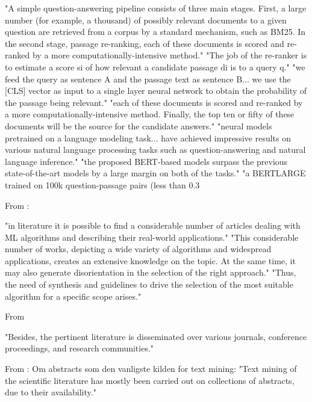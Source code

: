"A simple question-answering pipeline consists of three main stages. First, a large number (for example, a thousand) of possibly relevant documents to a given question are retrieved from a corpus by a standard mechanism, such as BM25. In the second stage, passage re-ranking, each of these documents is scored and re-ranked by a more computationally-intensive method."
"The job of the re-ranker is to estimate a score si of how relevant a candidate passage di is to a query q."
"we feed the query as sentence A and the passage text as sentence B... we use the [CLS] vector as input to a single layer neural network to obtain the probability of the passage being relevant."
"each of these documents is scored and re-ranked by a more computationally-intensive method. Finally, the top ten or fifty of these documents will be the source for the candidate answers."
"neural models pretrained on a language modeling task... have achieved impressive results on various natural language processing tasks such as question-answering and natural language inference."
"the proposed BERT-based models surpass the previous state-of-the-art models by a large margin on both of the tasks."
"a BERTLARGE trained on 100k question-passage pairs (less than 0.3%


From \parencite{sala2018selecting_ml_algorithm} :

"in literature it is possible to find a considerable number of articles dealing with ML algorithms and describing their real-world applications."
"This considerable number of works, depicting a wide variety of algorithms and widespread applications, creates an extensive knowledge on the topic. At the same time, it may also generate disorientation in the selection of the right approach."
"Thus, the need of synthesis and guidelines to drive the selection of the most suitable algorithm for a specific scope arises."

From \parencite{adekoya2022applications_ai_em}

"Besides, the pertinent literature is disseminated over various journals, conference proceedings, and research communities."

From \parencite{westergaard2018comprehensive_quantitative_comparison_text_mining_15_million_full_text_articles_versus_corresponding_abstracts} :
Om abstracts som den vanligste kilden for text mining:
"Text mining of the scientific literature has mostly been carried out on collections of abstracts, due to their availability."

